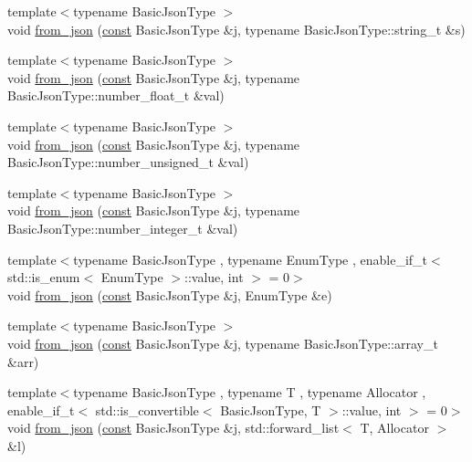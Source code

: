 \begin{DoxyCompactItemize}
\item 
{\footnotesize template$<$typename Basic\+Json\+Type $>$ }\\void \hyperlink{namespacenlohmann_1_1detail_ad74d89f77ada7a57eff38b43d4bf2335}{from\+\_\+json} (\hyperlink{functions__c_8js_afacfd9c985d225bb07483b887a801b6f}{const} Basic\+Json\+Type \&j, typename Basic\+Json\+Type\+::string\+\_\+t \&s)
\item 
{\footnotesize template$<$typename Basic\+Json\+Type $>$ }\\void \hyperlink{namespacenlohmann_1_1detail_a7cb5dd7d46a60e65f9a8e0873b3f7dd8}{from\+\_\+json} (\hyperlink{functions__c_8js_afacfd9c985d225bb07483b887a801b6f}{const} Basic\+Json\+Type \&j, typename Basic\+Json\+Type\+::number\+\_\+float\+\_\+t \&val)
\item 
{\footnotesize template$<$typename Basic\+Json\+Type $>$ }\\void \hyperlink{namespacenlohmann_1_1detail_ace4d5680ba413d9fd897ccb5d9c61a1c}{from\+\_\+json} (\hyperlink{functions__c_8js_afacfd9c985d225bb07483b887a801b6f}{const} Basic\+Json\+Type \&j, typename Basic\+Json\+Type\+::number\+\_\+unsigned\+\_\+t \&val)
\item 
{\footnotesize template$<$typename Basic\+Json\+Type $>$ }\\void \hyperlink{namespacenlohmann_1_1detail_a047d881e611fcac709dc318f730a1732}{from\+\_\+json} (\hyperlink{functions__c_8js_afacfd9c985d225bb07483b887a801b6f}{const} Basic\+Json\+Type \&j, typename Basic\+Json\+Type\+::number\+\_\+integer\+\_\+t \&val)
\item 
{\footnotesize template$<$typename Basic\+Json\+Type , typename Enum\+Type , enable\+\_\+if\+\_\+t$<$ std\+::is\+\_\+enum$<$ Enum\+Type $>$\+::value, int $>$  = 0$>$ }\\void \hyperlink{namespacenlohmann_1_1detail_a5440d650150d01e8015133521351b459}{from\+\_\+json} (\hyperlink{functions__c_8js_afacfd9c985d225bb07483b887a801b6f}{const} Basic\+Json\+Type \&j, Enum\+Type \&e)
\item 
{\footnotesize template$<$typename Basic\+Json\+Type $>$ }\\void \hyperlink{namespacenlohmann_1_1detail_abc62958462b916726b89f25fa381a129}{from\+\_\+json} (\hyperlink{functions__c_8js_afacfd9c985d225bb07483b887a801b6f}{const} Basic\+Json\+Type \&j, typename Basic\+Json\+Type\+::array\+\_\+t \&arr)
\item 
{\footnotesize template$<$typename Basic\+Json\+Type , typename T , typename Allocator , enable\+\_\+if\+\_\+t$<$ std\+::is\+\_\+convertible$<$ Basic\+Json\+Type, T $>$\+::value, int $>$  = 0$>$ }\\void \hyperlink{namespacenlohmann_1_1detail_a5cfb765aad92795abd7fda29d017272a}{from\+\_\+json} (\hyperlink{functions__c_8js_afacfd9c985d225bb07483b887a801b6f}{const} Basic\+Json\+Type \&j, std\+::forward\+\_\+list$<$ T, Allocator $>$ \&l)

\end{DoxyCompactItemize}
